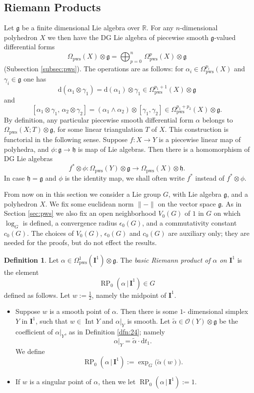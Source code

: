 \documentclass[10pt, a4paper]{amsart}
\theoremstyle{definition}
\newtheorem{dfn}[equation]{Definition}
\numberwithin{equation}{section}
\newcommand{\opn}{\operatorname}
\newcommand{\mfrak}[1]{\mathfrak{#1}}
\newcommand{\mcal}[1]{\mathcal{#1}}
\newcommand{\mbf}[1]{\mathbf{#1}}
\newcommand{\mrm}[1]{\mathrm{#1}}
\newcommand{\mbb}[1]{\mathbb{#1}}
\newcommand{\smfrac}[2]{{\textstyle \frac{#1}{#2}}}
\newcommand{\til}[1]{\tilde{#1}}
\newcommand{\norm}[1]{\lVert #1 \rVert}
\renewcommand{\vert}{\, | \,}
\newcommand{\R}{\mbb{R}}
\newcommand{\g}{\mfrak{g}}
\newcommand{\h}{\mfrak{h}}
\renewcommand{\d}{\mrm{d}}
\newcommand{\lb}{\linebreak}
\begin{document}
\subsection{Riemann Products}
Let $\g$ be a finite dimensional Lie algebra over $\R$. 
For any $n$-dimensional polyhedron $X$ we then have the DG Lie algebra  
of piecewise smooth $\g$-valued differential forms
\[ \Omega_{\mrm{pws}}(X) \otimes \mfrak{g} = \bigoplus_{p=0}^n \,
\Omega^p_{\mrm{pws}}(X) \otimes \mfrak{g}  \]
(Subsection \ref{subsec:pws}). 
The operations are as follows: for 
$\alpha_i \in \Omega^{p_i}_{\mrm{pws}}(X)$ and
$\gamma_i \in \g$ one has
\[ \d(\alpha_1 \otimes \gamma_1) = \d(\alpha_1) \otimes \gamma_1 
\in \Omega_{\mrm{pws}}^{p_1+1}(X) \otimes \g \]
and
\[ [ \alpha_1 \otimes \gamma_1,\, \alpha_2 \otimes \gamma_2 ] =
(\alpha_1 \wedge \alpha_2) \otimes [\gamma_1, \gamma_2] \in 
\Omega_{\mrm{pws}}^{p_1+ p_2}(X) \otimes \g . \]
By definition, any particular piecewise smooth differential form $\alpha$
belongs to 
$\Omega_{\mrm{pws}}(X; T) \otimes \mfrak{g}$, 
for some linear triangulation $T$ of $X$. 
This construction is functorial in the following sense. Suppose
$f : X \to Y$ is a piecewise linear map of polyhedra, and $\phi : \g \to \h$ is
map of Lie algebras. Then there is a homomorphism of DG Lie algebras
\[ f^* \otimes \phi : \Omega_{\mrm{pws}}(Y) \otimes \mfrak{g} \to 
\Omega_{\mrm{pws}}(X) \otimes \mfrak{h} . \]
In case $\h = \g$ and $\phi$ is the identity map, we shall often write
$f^*$ instead of $f^* \otimes \phi$.

{}From now on in this section we consider a Lie group $G$, with Lie
algebra $\mfrak{g}$, and a polyhedron $X$.
We fix some euclidean norm $\norm{-}$ on the vector space $\g$. As in
Section \ref{sec:pws} we also fix an open neighborhood $V_0(G)$ of $1$ in
$G$ on which $\log_G$ is defined, a convergence radius
$\epsilon_0(G)$, and a commutativity constant $c_0(G)$.
The choices of $V_0(G)$, $\epsilon_0(G)$ and $c_0(G)$ are auxiliary only; they
are needed for the proofs, but do not effect the results.

\begin{dfn} \label{dfn:1}
Let
$\alpha \in \Omega^1_{\mrm{pws}}(\mbf{I}^1) \otimes \mfrak{g}$. 
The {\em basic Riemann product of $\alpha$ on $\mbf{I}^1$} 
is the element 
\[ \opn{RP}_0(\alpha \vert \mbf{I}^1) \in G \]
defined as follows. Let 
$w := \smfrac{1}{2}$, namely the midpoint of $\mbf{I}^{1}$. 
\begin{itemize}
\item Suppose $w$ is a smooth point of $\alpha$. Then there is
some $1$- \lb dimensional simplex $Y$ in $\mbf{I}^{1}$, such that 
$w \in \opn{Int} Y$ and $\alpha|_{Y}$ is smooth. 
Let $\til{\alpha} \in \mcal{O}(Y) \otimes \mfrak{g}$ be the coefficient of
$\alpha|_Y$, as in Definition \ref{dfn:24}; namely
\[ \alpha|_Y = \til{\alpha} \cdot \d t_1 . \]
We define 
\[ \opn{RP}_{0}(\alpha \vert \mbf{I}^{1}) :=
\opn{exp}_G \bigl(  \til{\alpha}(w) \bigr) . \]
%
\item If $w$ is a singular point of $\alpha$, then we let
$\opn{RP}_{0}(\alpha \vert \mbf{I}^{1}) := 1$.
\end{itemize}
\end{dfn}
\end{document}
